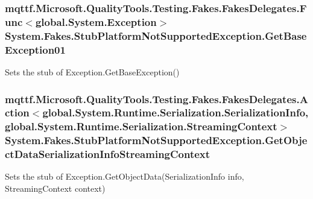 \hypertarget{class_system_1_1_fakes_1_1_stub_platform_not_supported_exception_a7ea12486b513bc20d230e5ac119b38d1}{
\subsubsection[{Get\-Base\-Exception01}]{\setlength{\rightskip}{0pt plus 5cm}mqttf.\-Microsoft.\-Quality\-Tools.\-Testing.\-Fakes.\-Fakes\-Delegates.\-Func$<$global.\-System.\-Exception$>$ System.\-Fakes.\-Stub\-Platform\-Not\-Supported\-Exception.\-Get\-Base\-Exception01}}\label{class_system_1_1_fakes_1_1_stub_platform_not_supported_exception_a7ea12486b513bc20d230e5ac119b38d1}


Sets the stub of Exception.\-Get\-Base\-Exception()

\hypertarget{class_system_1_1_fakes_1_1_stub_platform_not_supported_exception_ae3aa5f644e9a3fe35f9030e395fe5020}{
\subsubsection[{Get\-Object\-Data\-Serialization\-Info\-Streaming\-Context}]{\setlength{\rightskip}{0pt plus 5cm}mqttf.\-Microsoft.\-Quality\-Tools.\-Testing.\-Fakes.\-Fakes\-Delegates.\-Action$<$global.\-System.\-Runtime.\-Serialization.\-Serialization\-Info, global.\-System.\-Runtime.\-Serialization.\-Streaming\-Context$>$ System.\-Fakes.\-Stub\-Platform\-Not\-Supported\-Exception.\-Get\-Object\-Data\-Serialization\-Info\-Streaming\-Context}}\label{class_system_1_1_fakes_1_1_stub_platform_not_supported_exception_ae3aa5f644e9a3fe35f9030e395fe5020}


Sets the stub of Exception.\-Get\-Object\-Data(\-Serialization\-Info info, Streaming\-Context context)

